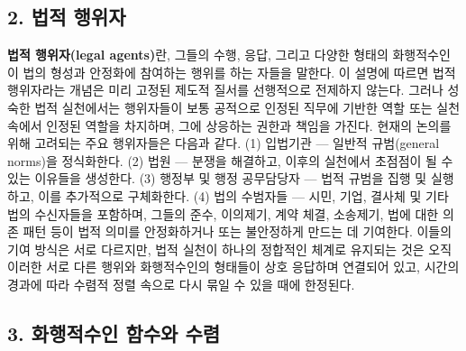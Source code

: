 \documentclass[12pt,a4paper]{article}
\begin{document}
\subsection{2. 법적 행위자}

\textbf{법적 행위자(legal agents)}란, 그들의 수행, 응답, 그리고 다양한
형태의 화행적수인이 법의 형성과 안정화에 참여하는 행위를 하는 자들을
말한다. 이 설명에 따르면 법적 행위자라는 개념은 미리 고정된 제도적
질서를 선행적으로 전제하지 않는다. 그러나 성숙한 법적 실천에서는
행위자들이 보통 공적으로 인정된 직무에 기반한 역할 또는 실천 속에서
인정된 역할을 차지하며, 그에 상응하는 권한과 책임을 가진다. 현재의
논의를 위해 고려되는 주요 행위자들은 다음과 같다. (1) 입법기관 ---
일반적 규범(general norms)을 정식화한다. (2) 법원 --- 분쟁을 해결하고,
이후의 실천에서 초점점이 될 수 있는 이유들을 생성한다. (3) 행정부 및
행정 공무담당자 --- 법적 규범을 집행 및 실행하고, 이를 추가적으로
구체화한다. (4) 법의 수범자들 --- 시민, 기업, 결사체 및 기타 법의
수신자들을 포함하며, 그들의 준수, 이의제기, 계약 체결, 소송제기, 법에
대한 의존 패턴 등이 법적 의미를 안정화하거나 또는 불안정하게 만드는 데
기여한다. 이들의 기여 방식은 서로 다르지만, 법적 실천이 하나의 정합적인
체계로 유지되는 것은 오직 이러한 서로 다른 행위와 화행적수인의 형태들이
상호 응답하며 연결되어 있고, 시간의 경과에 따라 수렴적 정렬 속으로 다시
묶일 수 있을 때에 한정된다.

\subsection{3. 화행적수인 함수와
수렴}
\end{document}
